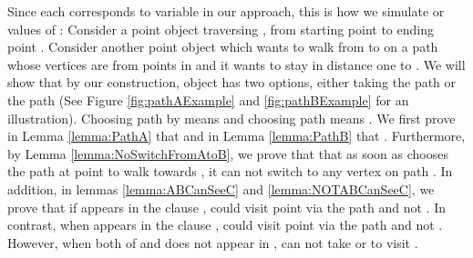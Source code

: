 \documentclass[a4paper,UKenglish]{lipics}
\begin{document}
Since each  corresponds to variable  in our approach, 
this is how we simulate  or  values of :
Consider a point object  
traversing , from starting point  to ending point . 
Consider 
another point object  which wants to 
walk from  to 
on a path whose vertices are from points in  and it wants to stay in distance one 
to . We will show that 
by our construction, object  has two options, either taking 
the path  or the path  
(See Figure \ref{fig:pathAExample} and \ref{fig:pathBExample} for an illustration). 
Choosing path  by  means  and choosing path  means .
We first prove in Lemma \ref{lemma:PathA} that  and 
in Lemma  \ref{lemma:PathB} that .
Furthermore, by
Lemma \ref{lemma:NoSwitchFromAtoB}, we prove that 
that as soon as  chooses 
the path  at point  to walk towards , 
it can not switch to any vertex on path .
In addition, in lemmas \ref{lemma:ABCanSeeC} and \ref{lemma:NOTABCanSeeC}, we prove that 
if  appears in the clause ,
 could visit point  via the path  and not . In contrast, 
when  appears in the clause ,
 could visit point  via the path  and not .
However, when both of   and  does not appear 
in ,  can not take 
or  to visit .
\end{document}
